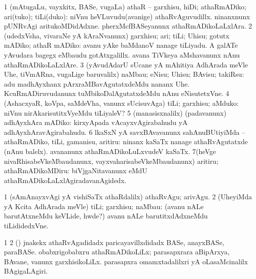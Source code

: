 {\noindent
\gl{\sakirx}
\expl{}
\bmng
\bnum
\num{1} (mAtugaLu, vayxkitx, BASe, \mo vugaLa) athaR -- garxhisu, hiDi; athaRmADiko; ari(tuko); tiLi(duko):  niVnu heVLuvudu(avanige) athaRvAguvudillx.  ninanxnunx pUNRvAgi aritukoMDidAdxne.  pherxMcfBASeyanunx athaRmADikoLaLxlAra. 
\num{2} (udedxVsha, vivaraNe yA kAraNvanunx) garxhisu; ari; tiLi; Uhisu; gotutx mADiko; athaR mADiko:  avanu yAke baMdanoV nanage tiLiyadu.  A galATe yAvudara bagegx eMbaudu gotAtxgalillx.  avana TiVkeya aMshavanunx nAnu athaRmADikoLaLxlAre. 
\num{3} (yAvudAdarU sUcane yA mAhitiya AdhArada meVle Uhe, tiVmARna, \mo vugaLige baruvalilx) naMbau; eNisu; Uhisu; BAvisu; takiRsu:  adu madhAyxhanx pArxraMBavAgutatxdeMdu nananx Uhe.  KcuRmADiruvudanunx tuMbikoDalAgutatxdeMdu nAnu eNisutetxVne. 
\num{4} (AshacxyaR, koVpa, saMdeVha, \mo vanunx sUcisuvAga) tiLi; garxhisu; aMduko:  niVnu nirAkarisutitxVyeMdu tiLiyaleV? 
\num{5} (manasisxnalilx) (padavanunx) adhAyxhAra mADiko:  kirxyApada vAcayxvAgirabahudu yA adhAyxhAravAgirabahudu. 
\num{6} lkaSxN yA savxBAvavanunx sahAnuBUtiyiMda -- athaRmADiko, tiLi, gamanisu, aritiru:  ninanx kaSaTx nanage athaRvAgutatxde (nAnu balelx).  avananunx athaRmADikoLuLxvudeV kaSaTx. 
\num{7}(heVge nivaRhisabeVkeMbaudanunx, vayxvaharisabeVkeMbaudanunx) aritiru; athaRmADikoMDiru:  biVjgaNitavanunx eMdU athaRmADikoLaLxlAgiradavanAgidedx. 
\enum
\emng

\noindent
\gl{\akirx}
\expl{}
\bmng
\bnum
\num{1} (sAmAnayxvAgi yA vishiSaTx athaRdalilx) athaRvAgu; arivAgu. 
\num{2} (UheyiMda yA Kcita AdhArada meVle) tiLi; garxhisu; naMbau:  (avanu nALe barutAtxneMdu keVLide, hwde?) avanu nALe barutitxdAdxneMdu tiLididedxVne. 
\enum
\emng

\noindent
\gl{\pagu}
\expl{}
\bmng
\bnum
\num{1}  
\num{2}  (\pArxparx) jnakekx athaRvAgadidadx paricayavillxdidadx BASe, anayxBASe, paraBASe. 
  
\banum
{} obabxrigobabxru athaRmADikoLiLx; parasapxrara aBipArxya, BAvane, \mo vanunx garxhisikoLiLx. 
 parasapxra omamxtadalilxri yA oLasaMcinalilx BAgigaLAgiri. 
\eanum
\numie
\enum
\emng
\eentry

}
